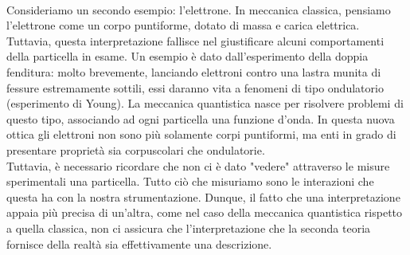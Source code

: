 \documentclass[]{article}
\begin{document}
	\\
	Consideriamo un secondo esempio: l'elettrone. In meccanica classica, pensiamo l'elettrone come un corpo puntiforme, dotato di massa e carica elettrica. Tuttavia, questa interpretazione fallisce nel giustificare alcuni comportamenti della particella in esame. Un esempio è dato dall'esperimento della doppia fenditura: molto brevemente, lanciando elettroni contro una lastra munita di fessure estremamente sottili, essi daranno vita a fenomeni di tipo ondulatorio (esperimento di Young). La meccanica quantistica nasce per risolvere problemi di questo tipo, associando ad ogni particella una funzione d'onda. In questa nuova ottica gli elettroni non sono più solamente corpi puntiformi, ma enti in grado di presentare proprietà sia corpuscolari che ondulatorie.\\
	Tuttavia, è necessario ricordare che non ci è dato "vedere" attraverso le misure sperimentali una particella. Tutto ciò che misuriamo sono le interazioni che questa ha con la nostra strumentazione. Dunque, il fatto che una interpretazione appaia più precisa di un'altra, come nel caso della meccanica quantistica rispetto a quella classica, non ci assicura che l'interpretazione che la seconda teoria fornisce della realtà sia effettivamente una descrizione.    \\\\ 
\end{document}
